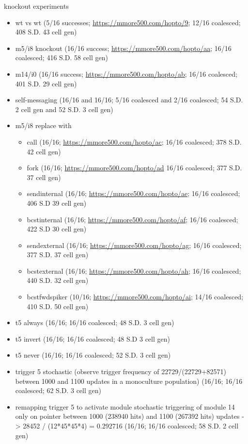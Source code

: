 knockout experiments
\begin{itemize}
  \item wt vs wt (5/16 successes; \url{https://mmore500.com/hopto/9}; 12/16 coalesced; 408 S.D. 43 cell gen)
  \item m5/i8 knockout (16/16 success; \url{https://mmore500.com/hopto/aa}; 16/16 coalesced; 416 S.D. 58 cell gen)
  \item m14/i0 (16/16 success; \url{https://mmore500.com/hopto/ab}; 16/16 coalesced; 401 S.D. 29 cell gen)
  \item self-messaging (16/16 and 16/16; 5/16 coalesced and 2/16 coalesced; 54 S.D. 2 cell gen and 52 S.D. 3 cell gen)
  \item m5/i8 replace with
  \begin{itemize}
	\item call (16/16; \url{https://mmore500.com/hopto/ac}; 16/16 coalesced; 378 S.D. 42 cell gen)
    \item fork (16/16; \url{https://mmore500.com/hopto/ad} 16/16 coalesced; 377 S.D. 37 cell gen)
    \item sendinternal (16/16; \url{https://mmore500.com/hopto/ae}; 16/16 coalesced; 406 S.D 39 cell gen)
    \item bcstinternal (16/16; \url{https://mmore500.com/hopto/af}; 16/16 coalesced; 422 S.D 30 cell gen)
    \item sendexternal (16/16; \url{https://mmore500.com/hopto/ag}; 16/16 coalesced; 377 S.D. 37 cell gen)
    \item bcstexternal (16/16; \url{https://mmore500.com/hopto/ah}; 16/16 coalesced; 440 S.D. 32 cell gen)
    \item bcstfwdspiker (10/16; \url{https://mmore500.com/hopto/ai}; 14/16 coalesced; 410 S.D. 50 cell gen)
  \end{itemize}
  \item t5 always (16/16; 16/16 coalesced; 48 S.D. 3 cell gen)
  \item t5 invert (16/16; 16/16 coalesced; 48 S.D 3 cell gen)
  \item t5 never (16/16; 16/16 coalesced; 52 S.D. 3 cell gen)
  \item trigger 5 stochastic (observe trigger frequency of 22729/(22729+82571) between 1000 and 1100 updates in a monoculture population) (16/16; 16/16 coalesced; 62 S.D. 3 cell gen)
  \item remapping trigger 5 to activate module stochastic triggering of module 14 only on pointer between 1000 (238940 hits) and 1100 (267392 hits) updates -> 28452 / (12*45*45*4) = 0.292716 (16/16; 16/16 coalesced; 58 S.D. 2 cell gen)
\end{itemize}


